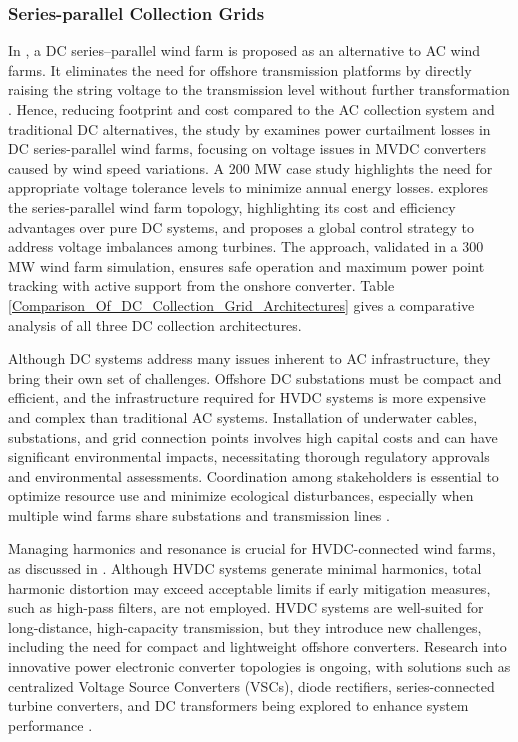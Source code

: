 \documentclass{ieeeaccess}
\begin{document}
\subsubsection{\textbf{Series-parallel Collection Grids}} In \cite{bahirat2018operation}, a DC series–parallel wind farm is proposed as an alternative to AC wind farms. It eliminates the need for offshore transmission platforms by directly raising the string voltage to the transmission level without further transformation \cite{guo2015energy}. Hence, reducing footprint and cost compared to the AC collection system and traditional DC alternatives, the study by \cite{lakshmanan2022power} examines power curtailment losses in DC series-parallel wind farms, focusing on voltage issues in MVDC converters caused by wind speed variations. A 200 MW case study highlights the need for appropriate voltage tolerance levels to minimize annual energy losses. \cite{zhang2018overvoltage} explores the series-parallel wind farm topology, highlighting its cost and efficiency advantages over pure DC systems, and proposes a global control strategy to address voltage imbalances among turbines. The approach, validated in a 300 MW wind farm simulation, ensures safe operation and maximum power point tracking with active support from the onshore converter.
Table \ref{Comparison_Of_DC_Collection_Grid_Architectures} gives a comparative analysis of all three DC collection architectures.

Although DC systems address many issues inherent to AC infrastructure, they bring their own set of challenges. Offshore DC substations must be compact and efficient, and the infrastructure required for HVDC systems is more expensive and complex than traditional AC systems. Installation of underwater cables, substations, and grid connection points involves high capital costs and can have significant environmental impacts, necessitating thorough regulatory approvals and environmental assessments. Coordination among stakeholders is essential to optimize resource use and minimize ecological disturbances, especially when multiple wind farms share substations and transmission lines \cite{mastoi2023large}.


Managing harmonics and resonance is crucial for HVDC-connected wind farms, as discussed in \cite{karlsson2023managing}. Although HVDC systems generate minimal harmonics, total harmonic distortion may exceed acceptable limits if early mitigation measures, such as high-pass filters, are not employed. HVDC systems are well-suited for long-distance, high-capacity transmission, but they introduce new challenges, including the need for compact and lightweight offshore converters. Research into innovative power electronic converter topologies is ongoing, with solutions such as centralized Voltage Source Converters (VSCs), diode rectifiers, series-connected turbine converters, and DC transformers being explored to enhance system performance \cite{li2021review}.
\end{document}

